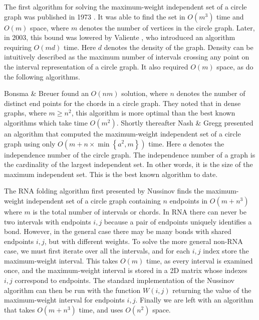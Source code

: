 \documentclass[12pt, a4paper]{article}
\begin{document}
The first algorithm for solving the maximum-weight independent set of a circle graph was published in 1973 \cite{gavril1973algorithms}. It was able to find the set in $O(m^3)$ time and $O(m)$ space, where $m$ denotes the number of vertices in the circle graph. Later, in 2003, this bound was lowered by Valiente \cite{valiente2003new}, who introduced an algorithm requiring $O(md)$ time. Here $d$ denotes the density of the graph. Density can be intuitively described as the maximum number of intervals crossing any point on the interval representation of a circle graph.  It also required $O(m)$ space, as do the following algorithms.

Bonsma \& Breuer \cite{bonsma2012counting} found an $O(nm)$ solution, where $n$ denotes the number of distinct end points for the chords in a circle graph. They noted that in dense graphs, where $m \geq n^2$, this algorithm is more optimal than the best known algorithms which take time $O(m^2)$. Shortly thereafter Nash \& Gregg \cite{nash2013new} presented an algorithm that computed the maximum-weight independent set of a circle graph using only $O(m + n\times \min \left\lbrace a^2, m\right\rbrace)$ time. Here $a$ denotes the independence number of the circle graph. The independence number of a graph is the cardinality of the largest independent set. In other words, it is the size of the maximum independent set. This is the best known algorithm to date.

The RNA folding algorithm first presented by Nussinov finds the maximum-weight independent set of a circle graph containing $n$ endpoints in $O(m + n^3)$ where $m$ is the total number of intervals or chords. In RNA there can never be two intervals with endpoints $i, j$ because a pair of endpoints uniquely identifies a bond. However, in the general case there may be many bonds with shared endpoints $i, j$, but with different weights. To solve the more general non-RNA case, we must first iterate over all the intervals, and for each $i, j$ index store the maximum-weight interval. This takes $O(m)$ time, as every interval is examined once, and the maximum-weight interval is stored in a 2D matrix whose indexes $i, j$ correspond to endpoints. The standard implementation of the Nussinov algorithm can then be run with the function $W(i, j)$ returning the value of the maximum-weight interval for endpoints $i, j$. Finally we are left with an algorithm that takes $O(m + n^3)$ time, and uses $O(n^2)$ space.
\end{document}

